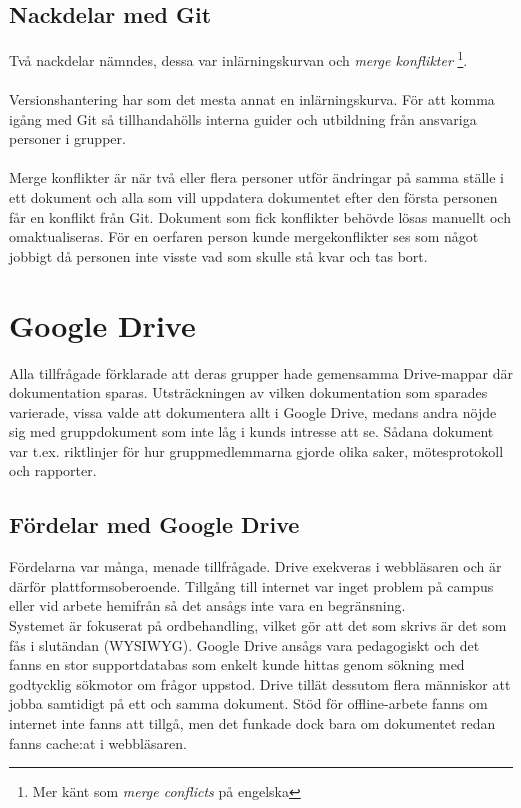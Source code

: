\subsection{Nackdelar med Git}
Två nackdelar nämndes, dessa var inlärningskurvan och \textit{merge konflikter} \footnote{Mer känt som \textit{merge conflicts} på engelska}.
\\ \\
Versionshantering har som det mesta annat en inlärningskurva. För att komma igång med Git så tillhandahölls interna guider och utbildning från ansvariga personer i grupper.
\\ \\
Merge konflikter är när två eller flera personer utför ändringar på samma ställe i ett dokument och alla som vill uppdatera dokumentet efter den första personen får en konflikt från Git. Dokument som fick konflikter behövde lösas manuellt och omaktualiseras. För en oerfaren person kunde mergekonflikter ses som något jobbigt då personen inte visste vad som skulle stå kvar och tas bort.

\section{Google Drive}
\label{sec:wassing-googledrive}
Alla tillfrågade förklarade att deras grupper hade gemensamma Drive-mappar där dokumentation sparas. Utsträckningen av vilken dokumentation som sparades varierade, vissa valde att dokumentera allt i Google Drive, medans andra nöjde sig med gruppdokument som inte låg i kunds intresse att se. Sådana dokument var t.ex. riktlinjer för hur gruppmedlemmarna gjorde olika saker, mötesprotokoll och rapporter.

\subsection{Fördelar med Google Drive}
\label{subsec:wassing-googledrive-pros}
Fördelarna var många, menade tillfrågade. Drive exekveras i webbläsaren och är därför plattformsoberoende. Tillgång till internet var inget problem på campus eller vid arbete hemifrån så det ansågs inte vara en begränsning.\\
Systemet är fokuserat på ordbehandling, vilket gör att det som skrivs är det som fås i slutändan (WYSIWYG). Google Drive ansågs vara pedagogiskt och det fanns en stor supportdatabas som enkelt kunde hittas genom sökning med godtycklig sökmotor om frågor uppstod. Drive tillät dessutom flera människor att jobba samtidigt på ett och samma dokument. Stöd för offline-arbete fanns om internet inte fanns att tillgå, men det funkade dock bara om dokumentet redan fanns cache:at i webbläsaren.

